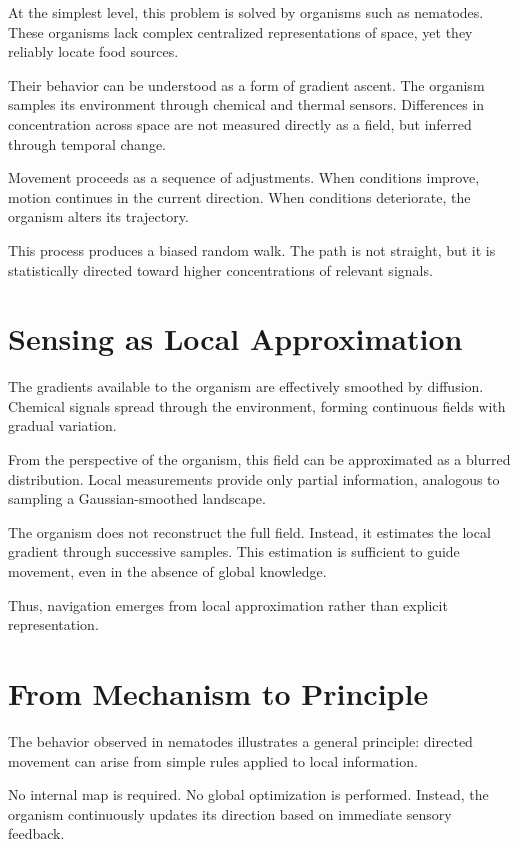 \documentclass[11pt,oneside]{book}
\begin{document}
At the simplest level, this problem is solved by organisms such as nematodes. These organisms lack complex centralized representations of space, yet they reliably locate food sources.

Their behavior can be understood as a form of gradient ascent. The organism samples its environment through chemical and thermal sensors. Differences in concentration across space are not measured directly as a field, but inferred through temporal change.

Movement proceeds as a sequence of adjustments. When conditions improve, motion continues in the current direction. When conditions deteriorate, the organism alters its trajectory.

This process produces a biased random walk. The path is not straight, but it is statistically directed toward higher concentrations of relevant signals.

\section{Sensing as Local Approximation}

The gradients available to the organism are effectively smoothed by diffusion. Chemical signals spread through the environment, forming continuous fields with gradual variation.

From the perspective of the organism, this field can be approximated as a blurred distribution. Local measurements provide only partial information, analogous to sampling a Gaussian-smoothed landscape.

The organism does not reconstruct the full field. Instead, it estimates the local gradient through successive samples. This estimation is sufficient to guide movement, even in the absence of global knowledge.

Thus, navigation emerges from local approximation rather than explicit representation.

\section{From Mechanism to Principle}

The behavior observed in nematodes illustrates a general principle: directed movement can arise from simple rules applied to local information.

No internal map is required. No global optimization is performed. Instead, the organism continuously updates its direction based on immediate sensory feedback.
\end{document}
